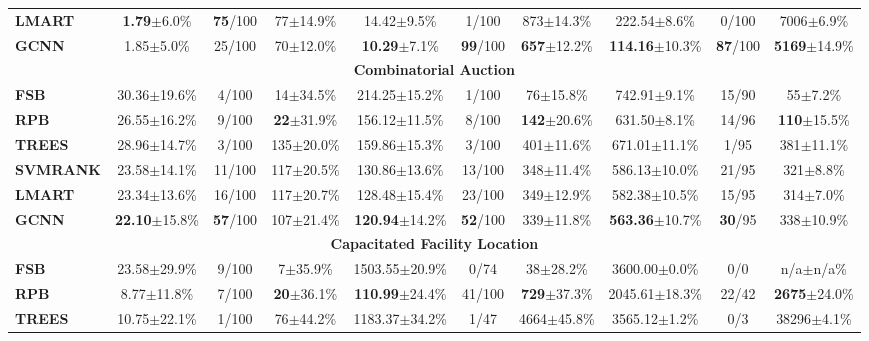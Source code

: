 \begin{table*}[htb!]
\begin{footnotesize}
\begin{tabular}{|l c c c c c c c c c|}
        \textbf{LMART} & \textbf{1.79}$\pm$6.0\% & \textbf{75}/100 & 77$\pm$14.9\% & 14.42$\pm$9.5\% & 1/100 & 873$\pm$14.3\% & 222.54$\pm$8.6\% & 0/100 & 7006$\pm$6.9\%\\
        \textbf{GCNN} & 1.85$\pm$5.0\% & 25/100 & 70$\pm$12.0\% & \textbf{10.29}$\pm$7.1\% & \textbf{99}/100 & \textbf{657}$\pm$12.2\% & \textbf{114.16}$\pm$10.3\% & \textbf{87}/100 & \textbf{5169}$\pm$14.9\%\\
        \multicolumn{10}{|c|}{\textbf{Combinatorial Auction}}\\
        \hline
        \textbf{FSB} & 30.36$\pm$19.6\% & 4/100 & 14$\pm$34.5\% & 214.25$\pm$15.2\% & 1/100 & 76$\pm$15.8\% & 742.91$\pm$9.1\% & 15/90 & 55$\pm$7.2\%\\
        \textbf{RPB} & 26.55$\pm$16.2\% & 9/100 & \textbf{22}$\pm$31.9\% & 156.12$\pm$11.5\% & 8/100 & \textbf{142}$\pm$20.6\% & 631.50$\pm$8.1\% & 14/96 & \textbf{110}$\pm$15.5\%\\
        \textbf{TREES} & 28.96$\pm$14.7\% & 3/100 & 135$\pm$20.0\% & 159.86$\pm$15.3\% & 3/100 & 401$\pm$11.6\% & 671.01$\pm$11.1\% & 1/95 & 381$\pm$11.1\%\\
        \textbf{SVMRANK} & 23.58$\pm$14.1\% & 11/100 & 117$\pm$20.5\% & 130.86$\pm$13.6\% & 13/100 & 348$\pm$11.4\% & 586.13$\pm$10.0\% & 21/95 & 321$\pm$8.8\%\\
        \textbf{LMART} & 23.34$\pm$13.6\% & 16/100 & 117$\pm$20.7\% & 128.48$\pm$15.4\% & 23/100 & 349$\pm$12.9\% & 582.38$\pm$10.5\% & 15/95 & 314$\pm$7.0\%\\
        \textbf{GCNN} & \textbf{22.10}$\pm$15.8\% & \textbf{57}/100 & 107$\pm$21.4\% & \textbf{120.94}$\pm$14.2\% & \textbf{52}/100 & 339$\pm$11.8\% & \textbf{563.36}$\pm$10.7\% & \textbf{30}/95 & 338$\pm$10.9\%\\
        \multicolumn{10}{|c|}{\textbf{Capacitated Facility Location}}\\
        \hline
        \textbf{FSB} & 23.58$\pm$29.9\% & 9/100 & 7$\pm$35.9\% & 1503.55$\pm$20.9\% & 0/74 & 38$\pm$28.2\% & 3600.00$\pm$0.0\% & 0/0 & n/a$\pm$n/a\%\\
        \textbf{RPB} & 8.77$\pm$11.8\% & 7/100 & \textbf{20}$\pm$36.1\% & \textbf{110.99}$\pm$24.4\% & 41/100 & \textbf{729}$\pm$37.3\% & 2045.61$\pm$18.3\% & 22/42 & \textbf{2675}$\pm$24.0\%\\
        \textbf{TREES} & 10.75$\pm$22.1\% & 1/100 & 76$\pm$44.2\% & 1183.37$\pm$34.2\% & 1/47 & 4664$\pm$45.8\% & 3565.12$\pm$1.2\% & 0/3 & 38296$\pm$4.1\%\\

\end{tabular}
\end{footnotesize}
\end{table*}
